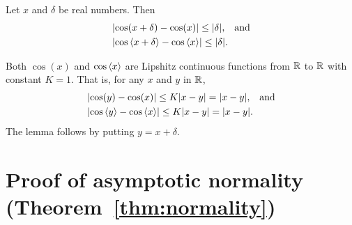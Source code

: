 \documentclass[journal]{IEEEtran}
\begin{document}
\begin{lemma}\label{lem:coslipshitz}
Let $x$ and $\delta$ be real numbers.  Then
\begin{align*}
&{\left\vert \cos(x + \delta) - \cos(x) \right\vert} \leq {\left\vert \delta \right\vert}, \;\;\; \text{and} \\
&{\left\vert \cos\left\langle x + \delta \right\rangle - \cos\left\langle x \right\rangle \right\vert} \leq {\left\vert \delta \right\vert}.
\end{align*}
\end{lemma}
\begin{IEEEproof}
Both $\cos(x)$ and $\cos\left\langle x \right\rangle$ are Lipshitz continuous functions from ${\mathbb R}$ to ${\mathbb R}$ with constant $K=1$.  That is, for any $x$ and $y$ in ${\mathbb R}$,
\begin{align*}
&{\left\vert \cos(y) - \cos(x) \right\vert} \leq K{\left\vert x-y \right\vert} = {\left\vert x-y \right\vert}, \;\;\; \text{and} \\
&{\left\vert \cos\left\langle y \right\rangle - \cos\left\langle x \right\rangle \right\vert} \leq K{\left\vert x-y \right\vert} = {\left\vert x-y \right\vert}.
\end{align*}
 The lemma follows by putting $y = x + \delta$.
\end{IEEEproof}

\section{Proof of asymptotic normality (Theorem~\ref{thm:normality}) } \label{sec:proof-asympt-norm}
\end{document}
